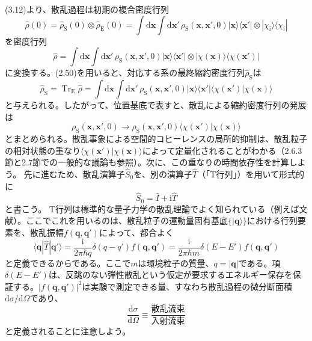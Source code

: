 (3.12)より、散乱過程は初期の複合密度行列
\begin{equation}
\hat\rho(0)=\hat\rho_{\mathrm S}(0)\otimes\hat\rho_{\mathrm E}(0)
=\int\mathrm d\bm x\int\mathrm d\bm x'\,\rho_{\mathrm S}(\bm x,\bm x',0)|\bm x\rangle\langle\bm x'|\otimes|\chi_{\mathrm i}\rangle\langle\chi_{\mathrm i}|
\tag{3.13}
\end{equation}
を密度行列
\begin{equation}
\hat\rho=\int\mathrm d\bm x\int\mathrm d\bm x'\,\rho_{\mathrm S}(\bm x,\bm x',0)|\bm x\rangle\langle\bm x'|\otimes|\chi(\bm x)\rangle\langle\chi(\bm x')|
\tag{3.14}
\end{equation}
に変換する。(2.50)を用いると、対応する系の最終縮約密度行列$\hat\rho_{\mathrm S}$は
\begin{equation}
\hat\rho_{\mathrm S}=\operatorname{Tr}_{\mathrm E}\hat\rho
=\int\mathrm d\bm x\int\mathrm d\bm x'\,\rho_{\mathrm S}(\bm x,\bm x',0)|\bm x\rangle\langle\bm x'|\langle\chi(\bm x')|\chi(\bm x)\rangle
\tag{3.15}
\end{equation}
と与えられる。したがって、位置基底で表すと、散乱による縮約密度行列の発展は
\begin{equation}
\rho_{\mathrm S}(\bm x,\bm x',0)\longrightarrow\rho_{\mathrm S}(\bm x,\bm x',0)\langle\chi(\bm x')|\chi(\bm x)\rangle
\tag{3.16}
\end{equation}
とまとめられる。散乱事象による空間的コヒーレンスの局所的抑制は、散乱粒子の相対状態の重なり$\langle\chi(\bm x')|\chi(\bm x)\rangle$によって定量化されることがわかる（2.6.3節と2.7節での一般的な議論も参照）。次に、この重なりの時間依存性を計算しよう。
先に進むため、散乱演算子$\hat S_0$を、別の演算子$\hat T$（「T行列」）を用いて形式的に
\begin{equation}
\hat S_0=\hat I+\mathrm i\hat T
\tag{3.17}
\end{equation}
と書こう。
\hypertarget{srcpage:123}{}\label{srcpage:123}
T行列は標準的な量子力学の散乱理論でよく知られている（例えば文献\cite{ref058}）。ここでこれを用いるのは、散乱粒子の運動量固有基底$\{|\bm q\rangle\}$における行列要素を、散乱振幅$f(\bm q,\bm q')$によって、都合よく
\begin{equation}
\langle\bm q|\hat T|\bm q'\rangle=\frac{\mathrm i}{2\pi\hbar q}\delta(q-q')f(\bm q,\bm q')
=\frac{\mathrm i}{2\pi\hbar m}\delta(E-E')f(\bm q,\bm q')
\tag{3.18}
\end{equation}
と定義できるからである。ここで$m$は環境粒子の質量、$q=|\bm q|$である。項$\delta(E-E')$は、反跳のない弾性散乱という仮定が要求するエネルギー保存を保証する。$|f(\bm q,\bm q')|^2$は実験で測定できる量、すなわち散乱過程の微分断面積$\mathrm d\sigma/\mathrm d\Omega$であり、
\begin{equation}
\frac{\mathrm d\sigma}{\mathrm d\Omega}\equiv\frac{\text{散乱流束}}{\text{入射流束}}
\tag{3.19}
\end{equation}
と定義されることに注意しよう。

